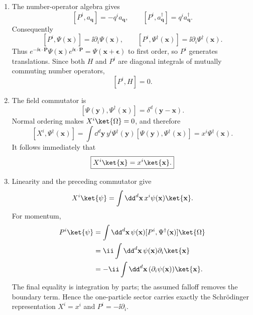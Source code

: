 \begin{enumerate}
\begin{enumerate}
\item
The number-operator algebra gives
\[
 [P^i,a_{\mathbf q}]=-q^i a_{\mathbf q},
 \qquad
 [P^i,a_{\mathbf q}^\dagger]=q^i a_{\mathbf q}^\dagger.
\]
Consequently
\[
 [P^i,\Psi(\mathbf x)]=\ii\partial_i\Psi(\mathbf x),
 \qquad
 [P^i,\Psi^\dagger(\mathbf x)]
 =\ii\partial_i\Psi^\dagger(\mathbf x).
\]
Thus
\(e^{-\ii\boldsymbol\epsilon\cdot\mathbf P}\Psi(\mathbf x)
e^{\ii\boldsymbol\epsilon\cdot\mathbf P}
=\Psi(\mathbf x+\boldsymbol\epsilon)\) to first order, so \(P^i\)
generates translations.  Since both \(H\) and \(P^i\) are diagonal
integrals of mutually commuting number operators,
\[
 \boxed{[P^i,H]=0.}
\]
\item
The field commutator is
\[
 [\Psi(\mathbf y),\Psi^\dagger(\mathbf x)]
 =\delta^d(\mathbf y-\mathbf x).
\]
Normal ordering makes \(X^i\ket{\Omega}=0\), and therefore
\[
 [X^i,\Psi^\dagger(\mathbf x)]
 =\int \dd^d\mathbf y\,
 y^i\Psi^\dagger(\mathbf y)
 [\Psi(\mathbf y),\Psi^\dagger(\mathbf x)]
 =x^i\Psi^\dagger(\mathbf x).
\]
It follows immediately that
\[
 \boxed{X^i\ket{\mathbf x}=x^i\ket{\mathbf x}.}
\]
\item
Linearity and the preceding commutator give
\[
 X^i\ket{\psi}
 =\int \dd^d\mathbf x\,x^i\psi(\mathbf x)\ket{\mathbf x}.
\]
For momentum,
\[
 \begin{split}
 P^i\ket{\psi}
 &=\int \dd^d\mathbf x\,\psi(\mathbf x)
 [P^i,\Psi^\dagger(\mathbf x)]\ket{\Omega}\\
 &=\ii\int \dd^d\mathbf x\,\psi(\mathbf x)
 \partial_i\ket{\mathbf x}\\
 &=-\ii\int \dd^d\mathbf x\,
 (\partial_i\psi(\mathbf x))\ket{\mathbf x}.
 \end{split}
\]
The final equality is integration by parts; the assumed falloff removes
the boundary term.  Hence the one-particle sector carries exactly the
Schr\"odinger representation
\(X^i=x^i\) and \(P^i=-\ii\partial_i\).
\end{enumerate}


\end{enumerate}
